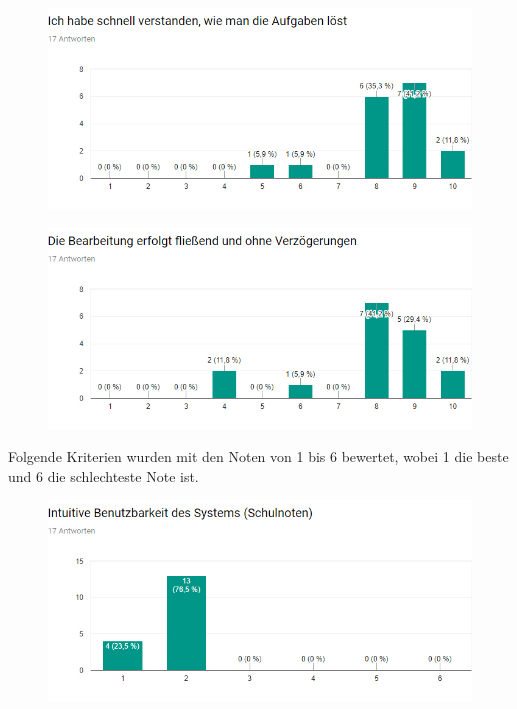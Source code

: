 \begin{figure}[H]
    \centering
    \includegraphics[width=15cm]{diagrams/ErgebnisStat7.jpg}
    \label{Ergebnis7}
\end{figure}

\begin{figure}[H]
    \centering
    \includegraphics[width=15cm]{diagrams/ErgebnisStat8.jpg}
    \label{Ergebnis8}
\end{figure}

Folgende Kriterien wurden mit den Noten von 1 bis 6 bewertet, wobei 1 die beste und 6 die schlechteste Note ist.

\begin{figure}[H]
    \centering
    \includegraphics[width=15cm]{diagrams/ErgebnisStatSchul1.jpg}
    \label{ErgebnisSchul1}
\end{figure}

